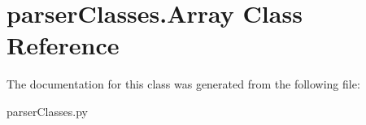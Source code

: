 \hypertarget{classparser_classes_1_1_array}{}\section{parser\+Classes.\+Array Class Reference}
\label{classparser_classes_1_1_array}


The documentation for this class was generated from the following file\+:\begin{DoxyCompactItemize}
\item 
parser\+Classes.\+py\end{DoxyCompactItemize}
